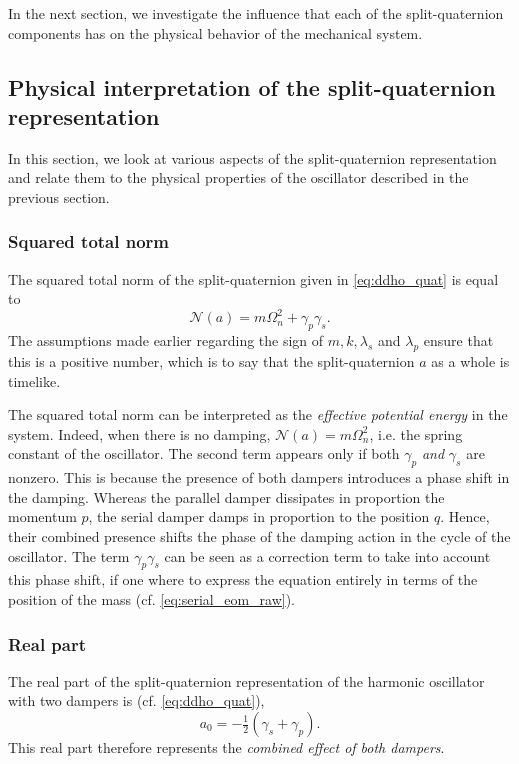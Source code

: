 In the next section, we investigate the influence that each of the split-quaternion components has on the physical behavior of the mechanical system.

\subsection{Physical interpretation of the split-quaternion representation}
In this section, we look at various aspects of the split-quaternion representation and relate them to the physical properties of the oscillator described in the previous section. 

\subsubsection{Squared total norm}
The squared total norm of the split-quaternion given in \cref{eq:ddho_quat} is equal to 
\begin{equation}
     \mathscr{N}(a) = m \Omega_n^2 + \gamma_p \gamma_s.
\end{equation}
The assumptions made earlier regarding the sign of $m, k, \lambda_s$ and $\lambda_p$ ensure that this is a positive number, which is to say that the split-quaternion $a$ as a whole is timelike.

The squared total norm can be interpreted as the \emph{effective potential energy} in the system. Indeed, when there is no damping, $\mathscr{N}(a) = m\Omega_n^2 $, i.e. the spring constant of the oscillator. The second term appears only if both $\gamma_p$ \emph{and} $\gamma_s$ are nonzero. This is because the presence of both dampers introduces a phase shift in the damping. Whereas the parallel damper dissipates in proportion the momentum $p$, the serial damper damps in proportion to the position $q$. Hence, their combined presence shifts the phase of the damping action in the cycle of the oscillator. The term $\gamma_p \gamma_s$ can be seen as a correction term to take into account this phase shift, if one where to express the equation entirely in terms of the position of the mass (cf. \cref{eq:serial_eom_raw}).

\subsubsection{Real part} 
The real part of the split-quaternion representation of the harmonic oscillator with two dampers is (cf. \cref{eq:ddho_quat}),
\begin{equation}
     a_0 = -\tfrac{1}{2}(\gamma_s + \gamma_p).
\end{equation}
This real part therefore represents the \emph{combined effect of both dampers}.

